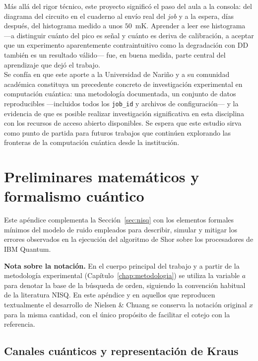 \documentclass[12pt, spanish]{book}
\begin{document}
Más allá del rigor técnico, este proyecto significó el paso del aula a la consola: del diagrama del circuito en el cuaderno al envío real del \textit{job} y a la espera, días después, del histograma medido a unos $50$~mK. Aprender a leer ese histograma ---a distinguir cuánto del pico es señal y cuánto es deriva de calibración, a aceptar que un experimento aparentemente contraintuitivo como la degradación con DD también es un resultado válido--- fue, en buena medida, parte central del aprendizaje que dejó el trabajo.\\

Se confía en que este aporte a la Universidad de Nariño y a su comunidad académica constituya un precedente concreto de investigación experimental en computación cuántica: una metodología documentada, un conjunto de datos reproducibles ---incluidos todos los \texttt{job\_id} y archivos de configuración--- y la evidencia de que es posible realizar investigación significativa en esta disciplina con los recursos de acceso abierto disponibles. Se espera que este estudio sirva como punto de partida para futuros trabajos que continúen explorando las fronteras de la computación cuántica desde la institución.

\appendix
\chapter{Preliminares matemáticos y formalismo cuántico}
\label{app:ruido}
 
Este apéndice complementa la Sección~\ref{sec:nisq} con los elementos formales mínimos del modelo de ruido empleados para describir, simular y mitigar los errores observados en la ejecución del algoritmo de Shor sobre los procesadores de IBM Quantum.

\textbf{Nota sobre la notación.} En el cuerpo principal del trabajo y a partir de la metodología experimental (Capítulo~\ref{chap:metodologia}) se utiliza la variable $a$ para denotar la base de la búsqueda de orden, siguiendo la convención habitual de la literatura NISQ. En este apéndice y en aquellos que reproducen textualmente el desarrollo de Nielsen \& Chuang \cite{Nielsen2024} se conserva la notación original $x$ para la misma cantidad, con el único propósito de facilitar el cotejo con la referencia.
 
\section{Canales cuánticos y representación de Kraus}
\label{app:kraus}
 
\end{document}
